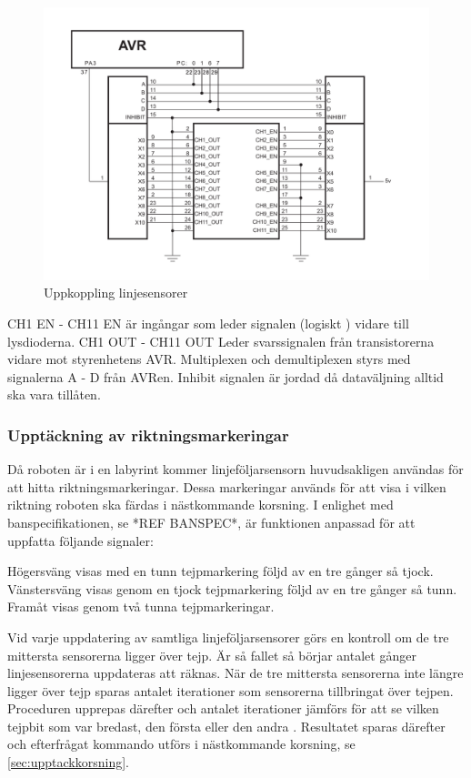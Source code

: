\begin{figure}[H]
  \centering
 \includegraphics[angle=0,scale=0.5]{bilder/Uppkoppling_linjesensorer.pdf}
  \caption{Uppkoppling linjesensorer}
  \label{fig:Uppkoppling_linjesensorer}
\end{figure}

CH1 EN - CH11 EN är ingångar som leder signalen (logiskt ) vidare till lysdioderna. 
CH1  OUT - CH11 OUT Leder svarssignalen från transistorerna vidare mot styrenhetens 
AVR. Multiplexen och demultiplexen styrs med signalerna A - D från AVRen. Inhibit 
signalen är jordad då dataväljning alltid ska vara tillåten.



\subsubsection{Upptäckning av riktningsmarkeringar}
\label{sec:riktmark}
Då roboten är i en labyrint kommer linjeföljarsensorn huvudsakligen användas 
för att hitta riktningsmarkeringar. Dessa markeringar används för att visa i 
vilken riktning roboten ska färdas i nästkommande korsning.  I enlighet med 
banspecifikationen, se *REF BANSPEC*, är funktionen anpassad för att uppfatta 
följande signaler:

Högersväng visas med en tunn tejpmarkering följd av en tre gånger så tjock.
Vänstersväng visas genom en tjock tejpmarkering följd av en tre gånger så tunn.
Framåt visas genom två tunna tejpmarkeringar.

Vid varje uppdatering av samtliga linjeföljarsensorer görs en kontroll om de 
tre mittersta sensorerna ligger över tejp. Är så fallet så börjar antalet 
gånger linjesensorerna uppdateras att räknas. När de tre mittersta sensorerna 
inte längre ligger över tejp sparas antalet iterationer som sensorerna 
tillbringat över tejpen. Proceduren upprepas därefter och antalet iterationer 
jämförs för att se vilken tejpbit som var bredast, den första eller den andra
. Resultatet sparas därefter och efterfrågat kommando utförs i nästkommande 
korsning, se \ref{sec:upptackkorsning}.


